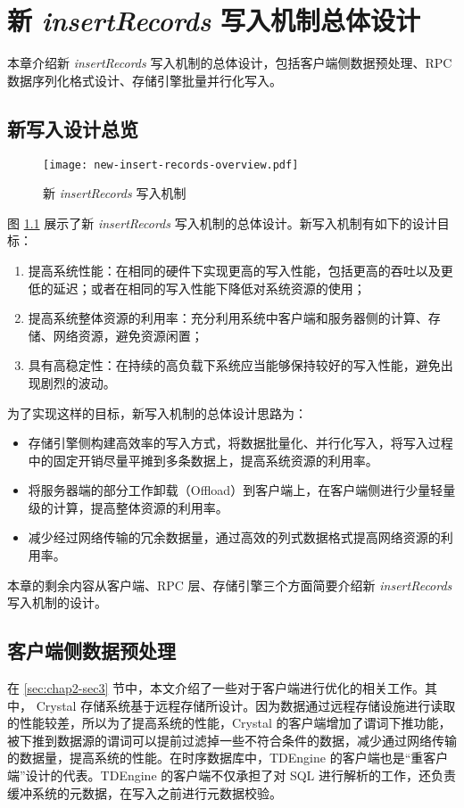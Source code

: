 
\chapter{新 \emph{insertRecords} 写入机制总体设计}
本章介绍新 \emph{insertRecords} 写入机制的总体设计，包括客户端侧数据预处理、RPC 数据序列化格式设计、存储引擎批量并行化写入。

\section{新写入设计总览}
\begin{figure}
  \centering
  \texttt{[image: new-insert-records-overview.pdf]}
  \caption{新 \emph{insertRecords} 写入机制}
  \label{fig:new-insert-records-overview}
\end{figure}

图 \ref{fig:new-insert-records-overview} 展示了新 \emph{insertRecords} 写入机制的总体设计。新写入机制有如下的设计目标：
\begin{enumerate}
  \item 提高系统性能：在相同的硬件下实现更高的写入性能，包括更高的吞吐以及更低的延迟；或者在相同的写入性能下降低对系统资源的使用；
  \item 提高系统整体资源的利用率：充分利用系统中客户端和服务器侧的计算、存储、网络资源，避免资源闲置；
  \item 具有高稳定性：在持续的高负载下系统应当能够保持较好的写入性能，避免出现剧烈的波动。
\end{enumerate}
为了实现这样的目标，新写入机制的总体设计思路为：
\begin{itemize}
  \item 存储引擎侧构建高效率的写入方式，将数据批量化、并行化写入，将写入过程中的固定开销尽量平摊到多条数据上，提高系统资源的利用率。
  \item 将服务器端的部分工作卸载（Offload）到客户端上，在客户端侧进行少量轻量级的计算，提高整体资源的利用率。
  \item 减少经过网络传输的冗余数据量，通过高效的列式数据格式提高网络资源的利用率。
\end{itemize}
本章的剩余内容从客户端、RPC 层、存储引擎三个方面简要介绍新 \emph{insertRecords} 写入机制的设计。

\section{客户端侧数据预处理}
在 \ref{sec:chap2-sec3} 节中，本文介绍了一些对于客户端进行优化的相关工作。其中， Crystal 存储系统基于远程存储所设计\cite{durner2021crystal}。因为数据通过远程存储设施进行读取的性能较差，所以为了提高系统的性能，Crystal 的客户端增加了谓词下推功能，被下推到数据源的谓词可以提前过滤掉一些不符合条件的数据，减少通过网络传输的数据量，提高系统的性能。在时序数据库中，TDEngine 的客户端也是“重客户端”设计的代表。TDEngine 的客户端不仅承担了对 SQL 进行解析的工作，还负责缓冲系统的元数据，在写入之前进行元数据校验。

